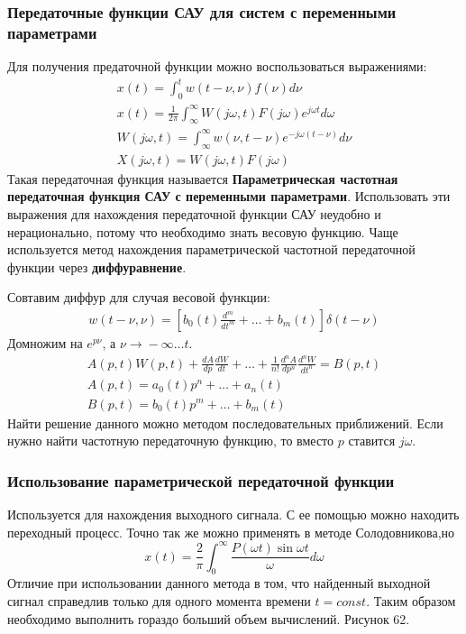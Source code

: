 \subsubsection{Передаточные функции САУ для систем с переменными параметрами}
Для получения предаточной функции можно воспользоваться выражениями:
\begin{align*}
	x(t)=\int^t_0w(t-\nu,\nu)f(\nu)d\nu \\
	x(t)=\frac1{2\pi}\int^{\infty}_{\infty}W(j\omega,t)F(j\omega)e^{j\omega{}t}d\omega \\
	W(j\omega,t)=\int^{\infty}_{\infty}w(\nu,t-\nu)e^{-j\omega(t-\nu)}d\nu \\
	X(j\omega,t)=W(j\omega,t)F(j\omega)
\end{align*}
Такая передаточная функция называется \textbf{Параметрическая частотная передаточная функция САУ с переменными параметрами}. Использовать эти выражения для нахождения передаточной функции САУ неудобно и нерационально, потому что необходимо знать весовую функцию. Чаще используется метод нахождения параметрической частотной передаточной функции через \textbf{диффуравнение}.

Совтавим диффур для случая весовой функции:
\begin{align*}
	[a_0(t)\frac{d^n}{dt^n}+\ldots+a_n(t)]w(t-\nu,\nu) = [b_0(t)\frac{d^m}{dt^m}+\ldots+b_m(t)]\delta(t-\nu)
\end{align*}
Домножим на $e^{p\nu}$, а $\nu\rightarrow{}-\infty\ldots{}t$.
\begin{align*}
	A(p,t)W(p,t)+\frac{dA}{dp}\frac{dW}{dt}+\ldots+\frac{1}{n!}\frac{d^nA}{dp^n}\frac{d^nW}{dt^n}=B(p,t) \\
	A(p,t)=a_0(t)p^n+\ldots+a_n(t) \\
	B(p,t)=b_0(t)p^m+\ldots+b_m(t)
\end{align*}
Найти решение данного можно методом последовательных приближений. Если нужно найти частотную передаточную функцию, то вместо $p$ 	ставится $j\omega$.

\subsubsection{Использование параметрической передаточной функции}
Используется для нахождения выходного сигнала. С ее помощью можно находить переходный процесс. Точно так же можно применять в методе Солодовникова,но
$$
	x(t)=\frac2{\pi}\int^{\infty}_0\frac{P(\omega{}t)\sin\omega{}t}{\omega}d\omega
$$
Отличие при использовании данного метода в том, что найденный выходной сигнал справедлив только для одного момента времени $t=const$. Таким образом необходимо выполнить гораздо больший объем вычислений. Рисунок 62.


